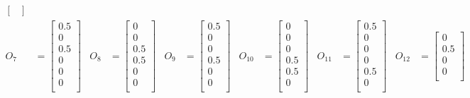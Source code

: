 \documentclass{mitschrift}
\begin{document}
\begin{align}
\begin{bmatrix}
    \end{bmatrix} \\
    O_7 &= \begin{bmatrix}
        0.5 \\
        0 \\
        0.5 \\
        0 \\
        0 \\
        0 \\
    \end{bmatrix} & 
    O_8 &= \begin{bmatrix}
        0 \\
        0 \\
        0.5 \\
        0.5 \\
        0 \\
        0 \\
    \end{bmatrix} & 
    O_9 &= \begin{bmatrix}
        0.5 \\
        0 \\
        0 \\
        0.5 \\
        0 \\
        0 \\
    \end{bmatrix} & 
    O_{10} &= \begin{bmatrix}
        0 \\
        0 \\
        0 \\
        0.5 \\
        0.5 \\
        0 \\
    \end{bmatrix} & 
    O_{11} &= \begin{bmatrix}
        0.5 \\
        0 \\
        0 \\
        0 \\
        0.5 \\
        0 \\
    \end{bmatrix} & 
    O_{12} &= \begin{bmatrix}
        0 \\
        0.5 \\
        0 \\
        0 \\

\end{bmatrix}
\end{align}
\end{document}
